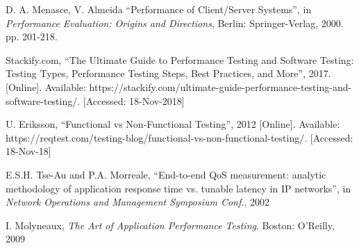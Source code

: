 \begin{thebibliography}{999}
	
	D. A. Menasce, V. Almeida
	``Performance of Client/Server Systems'',
	in \textit{Performance Evaluation: Origins and Directions},
	Berlin: Springer-Verlag, 2000.
	pp. 201-218.
	
	Stackify.com,
	``The Ultimate Guide to Performance Testing and Software Testing: Testing Types, Performance Testing Steps, Best Practices, and More'', 2017.
	[Online]. Available: https://stackify.com/ultimate-guide-performance-testing-and-software-testing/.
	[Accessed: 18-Nov-2018]
	
	U. Eriksson,
	``Functional vs Non-Functional Testing'', 2012
	[Online]. Available: https://reqtest.com/testing-blog/functional-vs-non-functional-testing/.
	[Accessed: 18-Nov-18]
	
	E.S.H. Tse-Au and P.A. Morreale,
	``End-to-end QoS measurement: analytic methodology of application response time vs. tunable latency in IP networks'',
	in \textit{Network Operations and Management Symposium Conf.}, 2002 
	
	I. Molyneaux, \textit{The Art of Application Performance Testing}.
	Boston: O'Reilly,
	2009
\end{thebibliography}
